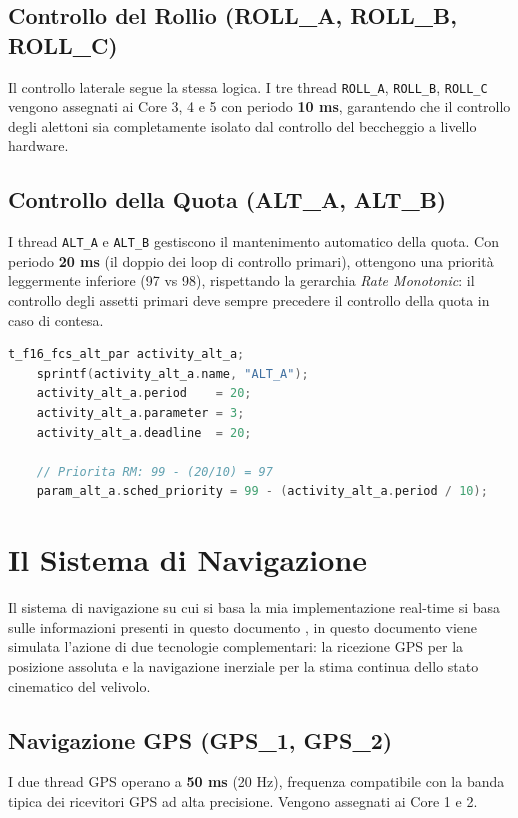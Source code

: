 \subsection{Controllo del Rollio (ROLL\_A, ROLL\_B, ROLL\_C)}
Il controllo laterale segue la stessa logica. I tre thread \texttt{ROLL\_A}, \texttt{ROLL\_B}, \texttt{ROLL\_C} vengono assegnati ai Core 3, 4 e 5 con periodo \textbf{10 ms}, garantendo che il controllo degli alettoni sia completamente isolato dal controllo del beccheggio a livello hardware.

\subsection{Controllo della Quota (ALT\_A, ALT\_B)}
I thread \texttt{ALT\_A} e \texttt{ALT\_B} gestiscono il mantenimento automatico della quota. Con periodo \textbf{20 ms} (il doppio dei loop di controllo primari), ottengono una priorità leggermente inferiore (97 vs 98), rispettando la gerarchia \textit{Rate Monotonic}: il controllo degli assetti primari deve sempre precedere il controllo della quota in caso di contesa.

\begin{lstlisting}[language=C++, caption={Configurazione di ALT\_A: periodo 20 ms, priorità 97}]
	t_f16_fcs_alt_par activity_alt_a;
	sprintf(activity_alt_a.name, "ALT_A");
	activity_alt_a.period    = 20;
	activity_alt_a.parameter = 3;
	activity_alt_a.deadline  = 20;
	
	// Priorita RM: 99 - (20/10) = 97
	param_alt_a.sched_priority = 99 - (activity_alt_a.period / 10);
\end{lstlisting}


\section{Il Sistema di Navigazione}
Il sistema di navigazione su cui si basa la mia implementazione real-time si basa sulle informazioni presenti in questo documento \cite{Navigation_System}, in questo documento viene simulata l'azione di due tecnologie complementari: la ricezione GPS per la posizione assoluta e la navigazione inerziale per la stima continua dello stato cinematico del velivolo.

\subsection{Navigazione GPS (GPS\_1, GPS\_2)}
I due thread GPS operano a \textbf{50 ms} (20 Hz), frequenza compatibile con la banda tipica dei ricevitori GPS ad alta precisione. Vengono assegnati ai Core 1 e 2.

